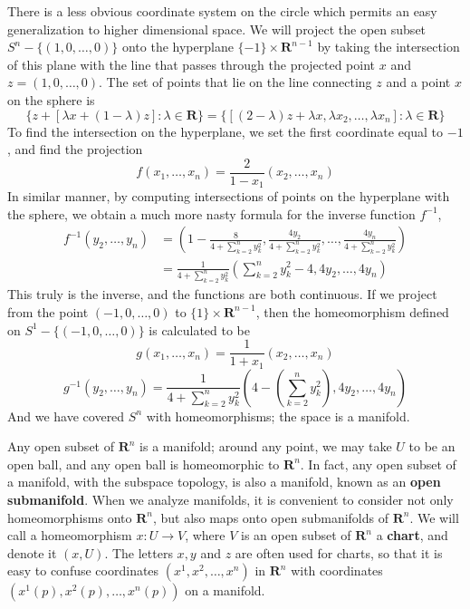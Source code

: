 \begin{example}
    There is a less obvious coordinate system on the circle which permits an easy generalization to higher dimensional space. We will project the open subset $S^n - \{(1,0,\dots,0)\}$ onto the hyperplane $\{-1\} \times \mathbf{R}^{n-1}$ by taking the intersection of this plane with the line that passes through the projected point $x$ and $z = (1,0, \dots, 0)$. The set of points that lie on the line connecting $z$ and a point $x$ on the sphere is
    \[ \{ z + [\lambda x + (1 - \lambda) z] : \lambda \in \mathbf{R} \} = \{ [(2 - \lambda)z + \lambda x, \lambda x_2, \dots, \lambda x_n] : \lambda \in \mathbf{R} \} \]
    To find the intersection on the hyperplane, we set the first coordinate equal to $-1$, and find the projection
    \[ f(x_1, \dots, x_n) = \frac{2}{1 - x_1}(x_2, \dots, x_n) \]
    In similar manner, by computing intersections of points on the hyperplane with the sphere, we obtain a much more nasty formula for the inverse function $f^{-1}$,
    \begin{align*}
        f^{-1}(y_2, \dots, y_n) &= \left(1 - \frac{8}{4 + \sum_{k = 2}^n y_k^2}, \frac{4y_2}{4 + \sum_{k = 2}^n y_k^2}, \dots, \frac{4y_n}{4 + \sum_{k = 2}^n y_k^2} \right)\\
        &= \frac{1}{4 + \sum_{k = 2}^n y_k^2} \left( \sum_{k = 2}^n y_k^2 - 4, 4y_2, \dots, 4y_n \right)
    \end{align*}
    This truly is the inverse, and the functions are both continuous. If we project from the point $(-1,0,\dots,0)$ to $\{ 1 \} \times \mathbf{R}^{n-1}$, then the homeomorphism defined on $S^1 - \{ (-1,0,\dots,0) \}$ is calculated to be
    \[ g(x_1, \dots, x_n) = \frac{1}{1 + x_1}(x_2, \dots, x_n) \]
    \[ g^{-1}(y_2, \dots, y_n) = \frac{1}{4 + \sum_{k = 2}^n y_k^2} \left( 4 - \left(\sum_{k = 2}^n y_k^2 \right), 4y_2, \dots, 4y_n \right) \]
    And we have covered $S^n$ with homeomorphisms; the space is a manifold.
\end{example}

Any open subset of $\mathbf{R}^n$ is a manifold; around any point, we may take $U$ to be an open ball, and any open ball is homeomorphic to $\mathbf{R}^n$. In fact, any open subset of a manifold, with the subspace topology, is also a manifold, known as an {\bf open submanifold}. When we analyze manifolds, it is convenient to consider not only homeomorphisms onto $\mathbf{R}^n$, but also maps onto open submanifolds of $\mathbf{R}^n$. We will call a homeomorphism $x: U \to V$, where $V$ is an open subset of $\mathbf{R}^n$ a {\bf chart}, and denote it $(x,U)$. The letters $x,y$ and $z$ are often used for charts, so that it is easy to confuse coordinates $(x^1,x^2, \dots, x^n)$ in $\mathbf{R}^n$ with coordinates $(x^1(p), x^2(p), \dots, x^n(p))$ on a manifold.


